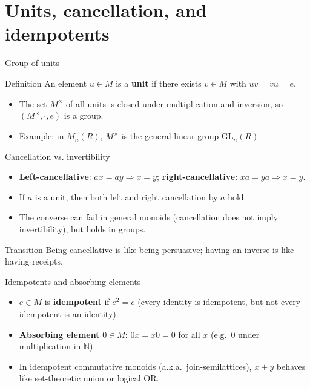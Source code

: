 \documentclass[aspectratio=169,11pt]{beamer}
\newcommand{\NN}{\mathbb{N}}
\begin{document}
\section{Units, cancellation, and idempotents}
\begin{frame}{Group of units}
\begin{block}{Definition}
An element $u\in M$ is a \textbf{unit} if there exists $v\in M$ with $uv=vu=e$.
\end{block}
\begin{itemize}
  \item The set $M^\times$ of all units is closed under multiplication and inversion, so $(M^\times,\cdot,e)$ is a group.
  \item Example: in $M_n(R)$, $M^\times$ is the general linear group $\mathrm{GL}_n(R)$.
\end{itemize}
\end{frame}

\begin{frame}{Cancellation vs. invertibility}
\begin{itemize}
  \item \textbf{Left-cancellative}: $ax=ay\Rightarrow x=y$; \textbf{right-cancellative}: $xa=ya\Rightarrow x=y$.
  \item If $a$ is a unit, then both left and right cancellation by $a$ hold.
  \item The converse can fail in general monoids (cancellation does not imply invertibility), but holds in groups.
\end{itemize}
\begin{block}{Transition}
Being cancellative is like being persuasive; having an inverse is like having receipts.
\end{block}
\end{frame}

\begin{frame}{Idempotents and absorbing elements}
\begin{itemize}
  \item $e\in M$ is \textbf{idempotent} if $e^2=e$ (every identity is idempotent, but not every idempotent is an identity).
  \item \textbf{Absorbing element} $0\in M$: $0x=x0=0$ for all $x$ (e.g.\ $0$ under multiplication in $\NN$).
  \item In idempotent commutative monoids (a.k.a.\ join-semilattices), $x+y$ behaves like set-theoretic union or logical OR.
\end{itemize}
\end{frame}
\end{document}
